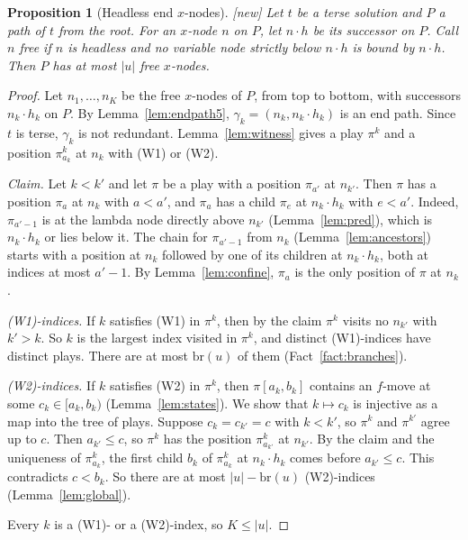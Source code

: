 \documentclass[11pt]{article}
\newcommand{\br}{\mathrm{br}}
\newcommand{\suc}[2]{#1{\cdot}#2}
\newcommand{\iv}[2]{\pi[#1,#2]}
\newcommand{\New}{\textsf{[new]}}
\theoremstyle{plain}
\newtheorem{proposition}[theorem]{Proposition}
\theoremstyle{definition}
\theoremstyle{remark}
\begin{document}
\begin{proposition}[Headless end $x$-nodes]\label{prop:headless}
\New{} Let $t$ be a terse solution and $P$ a path of $t$ from the root.
For an $x$-node $n$ on $P$, let $\suc nh$ be its successor on $P$.  Call
$n$ \emph{free} if $n$ is headless and no variable node strictly below
$\suc nh$ is bound by $\suc nh$.  Then $P$ has at most $|u|$ free
$x$-nodes.
\end{proposition}
\begin{proof}
Let $n_1,\dots,n_K$ be the free $x$-nodes of $P$, from top to bottom,
with successors $\suc{n_k}{h_k}$ on $P$.  By Lemma~\ref{lem:endpath5},
$\gamma_k=(n_k,\suc{n_k}{h_k})$ is an end path.  Since $t$ is terse,
$\gamma_k$ is not redundant.  Lemma~\ref{lem:witness} gives a play
$\pi^k$ and a position $\pi^k_{a_k}$ at $n_k$ with (W1) or (W2).

\emph{Claim.}  Let $k<k'$ and let $\pi$ be a play with a position
$\pi_{a'}$ at $n_{k'}$.  Then $\pi$ has a position $\pi_a$ at $n_k$ with
$a<a'$, and $\pi_a$ has a child $\pi_e$ at $\suc{n_k}{h_k}$ with
$e<a'$.  Indeed, $\pi_{a'-1}$ is at the lambda node directly above
$n_{k'}$ (Lemma~\ref{lem:pred}), which is $\suc{n_k}{h_k}$ or lies below
it.  The chain for $\pi_{a'-1}$ from $n_k$ (Lemma~\ref{lem:ancestors})
starts with a position at $n_k$ followed by one of its children at
$\suc{n_k}{h_k}$, both at indices at most $a'-1$.  By Lemma~\ref{lem:confine}, $\pi_a$ is the only position of $\pi$
at $n_k$.

\emph{(W1)-indices.}  If $k$ satisfies (W1) in $\pi^k$, then by the
claim $\pi^k$ visits no $n_{k'}$ with $k'>k$.  So $k$ is the largest
index visited in $\pi^k$, and distinct (W1)-indices have distinct plays.
There are at most $\br(u)$ of them (Fact~\ref{fact:branches}).

\emph{(W2)-indices.}  If $k$ satisfies (W2) in $\pi^k$, then
$\iv{a_k}{b_k}$ contains an $f$-move at some $c_k\in[a_k,b_k)$
(Lemma~\ref{lem:states}).  We show that $k\mapsto c_k$ is injective as a
map into the tree of plays.  Suppose $c_k=c_{k'}=c$ with $k<k'$, so
$\pi^k$ and $\pi^{k'}$ agree up to $c$.  Then $a_{k'}\le c$, so
$\pi^k$ has the position $\pi^k_{a_{k'}}$ at $n_{k'}$.  By the claim
and the uniqueness of $\pi^k_{a_k}$, the first child $b_k$ of
$\pi^k_{a_k}$ at $\suc{n_k}{h_k}$ comes before $a_{k'}\le c$.  This
contradicts $c<b_k$.  So there are at most $|u|-\br(u)$ (W2)-indices
(Lemma~\ref{lem:global}).

Every $k$ is a (W1)- or a (W2)-index, so $K\le|u|$.
\end{proof}
\end{document}
